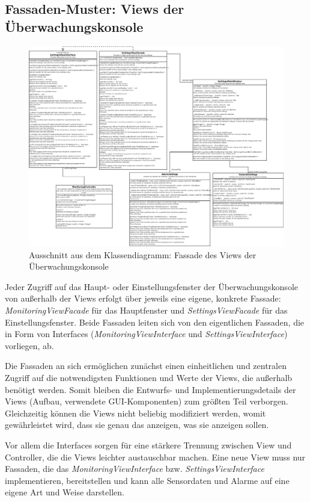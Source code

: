 \documentclass[parskip=full]{scrartcl}
\begin{document}
\pagebreak
\subsection{Fassaden-Muster: Views der Überwachungskonsole}
\begin{figure}[H]
  \centering
  \includegraphics[scale=0.22]{design/pattern-screenshots/facade-SettingsView.png}
  \caption{Ausschnitt aus dem Klassendiagramm: Fassade des Views der Überwachungskonsole}
\end{figure}
Jeder Zugriff auf das Haupt- oder Einstellungsfenster der Überwachungskonsole von außerhalb der Views erfolgt über jeweils eine eigene, konkrete Fassade:
\emph{MonitoringViewFacade} für das Hauptfenster und \emph{SettingsViewFacade} für das Einstellungsfenster. Beide Fassaden leiten sich von den eigentlichen Fassaden, die in Form
von Interfaces (\emph{MonitoringViewInterface} und \emph{SettingsViewInterface}) vorliegen, ab.

Die Fassaden an sich ermöglichen zunächst einen einheitlichen und zentralen Zugriff auf die notwendigsten Funktionen und Werte der Views, die außerhalb benötigt werden. Somit
bleiben die Entwurfs- und Implementierungsdetails der Views (Aufbau, verwendete GUI-Komponenten) zum größten Teil verborgen. Gleichzeitig können die Views nicht beliebig
modifiziert werden, womit gewährleistet wird, dass sie genau das anzeigen, was sie anzeigen sollen.

Vor allem die Interfaces sorgen für eine stärkere Trennung zwischen View und Controller, die die Views leichter austauschbar machen. Eine neue View muss nur Fassaden, die das
\emph{MonitoringViewInterface} bzw. \emph{SettingsViewInterface} implementieren, bereitstellen und kann alle Sensordaten und Alarme auf eine eigene Art und Weise darstellen.
\end{document}
